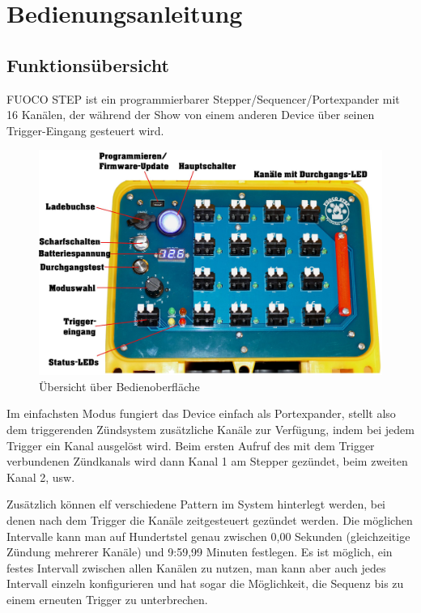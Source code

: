 \documentclass[paper=a4, open=any, numbers=noenddot]{scrbook}
\begin{document}
\part{Bedienungsanleitung}

	\chapter{Funktionsübersicht}

		FUOCO STEP ist ein programmierbarer Stepper/Sequencer/Portexpander mit 16 Kanälen, der während der Show von einem anderen Device über seinen Trigger-Eingang gesteuert wird.

		\begin{figure}[!b]
			\centering\includegraphics[width=\textwidth]{Bilder/oberflaeche}
			\caption{Übersicht über Bedienoberfläche}
			\label{fig:paneldescription}
		\end{figure}

		Im einfachsten Modus fungiert das Device einfach als Portexpander, stellt also dem triggerenden Zündsystem zusätzliche Kanäle zur Verfügung, indem bei jedem Trigger ein Kanal ausgelöst wird. Beim ersten Aufruf des mit dem Trigger verbundenen Zündkanals wird dann Kanal 1 am Stepper gezündet, beim zweiten Kanal 2, usw.

		Zusätzlich können elf verschiedene Pattern im System hinterlegt werden, bei denen nach dem Trigger die Kanäle zeitgesteuert gezündet werden. Die möglichen Intervalle kann man auf Hundertstel genau zwischen 0,00 Sekunden (gleichzeitige Zündung mehrerer Kanäle) und 9:59,99 Minuten festlegen. Es ist möglich, ein festes Intervall zwischen allen Kanälen zu nutzen, man kann aber auch jedes Intervall einzeln konfigurieren und hat sogar die Möglichkeit, die Sequenz bis zu einem erneuten Trigger zu unterbrechen.
\end{document}
